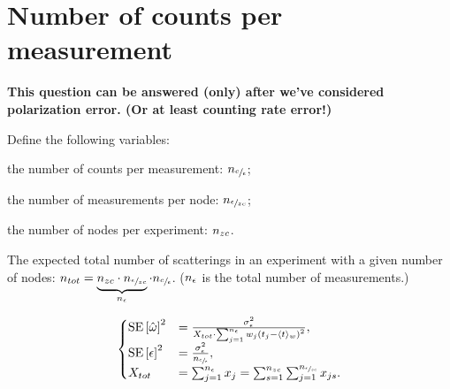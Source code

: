 \documentclass{article}
\begin{document}
%

\section{Number of counts per measurement}

\textbf{This question can be answered (only) after we've considered polarization error. (Or at least counting rate error!)}

Define the following variables: \begin{inparaenum}
	\item the number of counts per measurement: $n_{\sfrac{c}{\epsilon}}$;
	\item the number of measurements per node: $n_{\sfrac{\epsilon}{zc}}$;
	\item the number of nodes per experiment: $n_{zc}$.
\end{inparaenum}

The expected total number of scatterings in an experiment with a given number of nodes: $n_{tot} = \underbrace{n_{zc}\cdot n_{\sfrac{\epsilon}{zc}}}_{n_{\epsilon}}\cdot n_{\sfrac{c}{\epsilon}}$. ($n_{\epsilon}$ is the total number of measurements.)

\begin{equation}
\begin{cases}
	\SE{\hat{\omega}}^2 &= \frac{\SD{\meas}^2}{X_{tot}\cdot\sum_{j=1}^{\Nm}w_j\bkt{t_j - \avg{t}_w}^2}, \\
	\SE{\meas}^2 &= \frac{\SD{\meas}^2}{\Ncm} ,\\
	X_{tot} &= \sum_{j=1}^{\Nm} x_j = \sum_{s=1}^{\Nnd}\sum_{j=1}^{\Nmnd} x_{js}.
\end{cases}
\end{equation}
\end{document}
